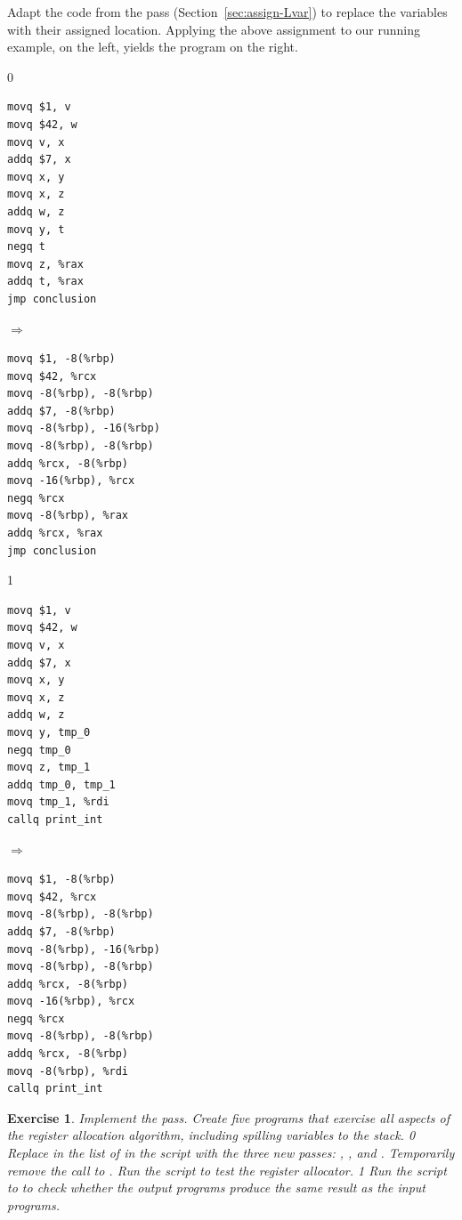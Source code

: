 \documentclass[7x10,nocrop]{TimesAPriori_MIT}%
\def\racketEd{0}
\def\pythonEd{1}
\def\edition{0}
\newtheorem{exercise}[theorem]{Exercise}
\begin{document}
Adapt the code from the  pass
(Section~\ref{sec:assign-Lvar}) to replace the variables with their
assigned location. Applying the above assignment to our running
example, on the left, yields the program on the right.
\begin{center}
{\if\edition\racketEd      
\begin{minipage}{0.3\textwidth}
\begin{lstlisting}
movq $1, v
movq $42, w
movq v, x
addq $7, x
movq x, y
movq x, z
addq w, z
movq y, t
negq t
movq z, %rax
addq t, %rax
jmp conclusion
\end{lstlisting}
\end{minipage}
$\Rightarrow\qquad$
\begin{minipage}{0.45\textwidth}
\begin{lstlisting}
movq $1, -8(%rbp)
movq $42, %rcx
movq -8(%rbp), -8(%rbp)
addq $7, -8(%rbp)
movq -8(%rbp), -16(%rbp)
movq -8(%rbp), -8(%rbp)
addq %rcx, -8(%rbp)
movq -16(%rbp), %rcx
negq %rcx
movq -8(%rbp), %rax
addq %rcx, %rax
jmp conclusion
\end{lstlisting}
\end{minipage}
\fi}
{\if\edition\pythonEd
\begin{minipage}{0.3\textwidth}
\begin{lstlisting}
movq $1, v
movq $42, w
movq v, x
addq $7, x
movq x, y
movq x, z
addq w, z
movq y, tmp_0
negq tmp_0
movq z, tmp_1
addq tmp_0, tmp_1
movq tmp_1, %rdi
callq print_int
\end{lstlisting}
\end{minipage}
$\Rightarrow\qquad$
\begin{minipage}{0.45\textwidth}
\begin{lstlisting}
movq $1, -8(%rbp)
movq $42, %rcx
movq -8(%rbp), -8(%rbp)
addq $7, -8(%rbp)
movq -8(%rbp), -16(%rbp)
movq -8(%rbp), -8(%rbp)
addq %rcx, -8(%rbp)
movq -16(%rbp), %rcx
negq %rcx
movq -8(%rbp), -8(%rbp)
addq %rcx, -8(%rbp)
movq -8(%rbp), %rdi
callq print_int    
\end{lstlisting}
\end{minipage}
\fi}
\end{center}

\begin{exercise}\normalfont\normalsize
Implement the  pass.
Create five programs that exercise all aspects of the register
allocation algorithm, including spilling variables to the stack.
%
{\if\edition\racketEd      
Replace  in the list of  in the
 script with the three new passes:
, , and
.
Temporarily remove the call to .
Run the script to test the register allocator.
\fi}
%
{\if\edition\pythonEd      
Run the  script to to check whether the
output programs produce the same result as the input programs.
\fi}
\end{exercise}
\end{document}

